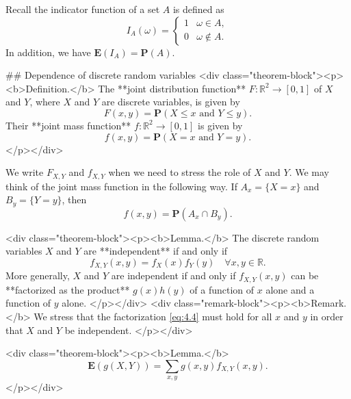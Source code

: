 Recall the indicator function of a set $A$ is defined as
$$\begin{equation}
    I_A(\omega) = \begin{cases} 1 & \omega \in A, \\
    0 & \omega \not\in A. \end{cases}
\end{equation}$$
In addition, we have $\mathbf{E}(I_A) = \mathbf{P}(A)$.


## Dependence of discrete random variables
<div class="theorem-block"><p><b>Definition.</b> 
The **joint distribution function** $F:\mathbb{R}^2 \to [0,1]$ of $X$ and $Y$, where $X$ and $Y$ are discrete variables, is given by 
$$\begin{equation}
    F(x, y) = \mathbf{P}(X\leq x \text{ and } Y \leq y). 
\end{equation}$$
Their **joint mass function** $f:\mathbb{R}^2 \to [0,1]$ is given by 
$$\begin{equation}
    f(x,y) = \mathbf{P}(X = x \text{ and } Y = y). 
\end{equation}$$
</p></div>

We write $F_{X,Y}$ and $f_{X,Y}$ when we need to stress the role of $X$ and $Y$. We may think of the joint mass function in the following way. If $A_x = \{X = x\}$ and $B_y = \{Y = y\}$, then 
$$\begin{equation}
    f(x,y) = \mathbf{P}(A_x \cap B_y).
\end{equation}$$

<div class="theorem-block"><p><b>Lemma.</b> 
The discrete random variables $X$ and $Y$ are **independent** if and only if 
$$$$$$$$\begin{equation}
    \label{eq:4.4}
    \tag{4-4}
    f_{X,Y}(x,y) = f_X(x)f_Y(y) \quad \forall x,y \in \mathbb{R}.
\end{equation}$$$$$$$$
More generally, $X$ and $Y$ are independent if and only if $f_{X,Y}(x, y)$ can be **factorized as the product** $g(x)h (y)$ of a function of $x$ alone and a function of $y$ alone. 
</p></div>
<div class="remark-block"><p><b>Remark.</b> 
We stress that the factorization \eqref{eq:4.4} must hold for all $x$ and $y$ in order that $X$ and $Y$ be independent. 
</p></div>

<div class="theorem-block"><p><b>Lemma.</b> 
$$\begin{equation}
    \mathbf{E}(g(X, Y))=\sum_{x, y} g(x, y) f_{X, Y}(x, y).
\end{equation}$$
</p></div>

